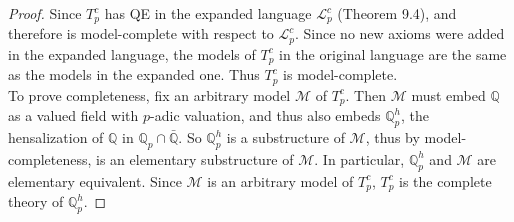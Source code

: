 \documentclass{article}
\begin{document}
  \begin{proof}
    Since $T_p^c$ has QE in the expanded language $\mathcal{L}_p^c$
    (Theorem 9.4), and therefore is model-complete with respect to
    $\mathcal{L}_p^c$. Since no new axioms were added in the expanded
    language, the models of $T_p^c$ in the original language are the same
    as the models in the expanded one. Thus $T_p^c$ is model-complete. \\

    To prove completeness, fix an arbitrary model $\mathcal{M}$ of $T_p^c$.
    Then $\mathcal{M}$ must embed $\mathbb{Q}$ as a valued field with
    $p$-adic valuation, and thus also embeds $\mathbb{Q}_p^h$, the
    hensalization of $\mathbb{Q}$ in $\mathbb{Q}_p\cap\bar{\mathbb{Q}}$. So
    $\mathbb{Q}_p^h$ is a substructure of $\mathcal{M}$, thus by
    model-completeness, is an elementary substructure of $\mathcal{M}$. In
    particular, $\mathbb{Q}_p^h$ and $\mathcal{M}$ are elementary
    equivalent. Since $\mathcal{M}$ is an arbitrary model of $T_p^c$,
    $T_p^c$ is the complete theory of $\mathbb{Q}_p^h$.
  \end{proof}
\end{document}
